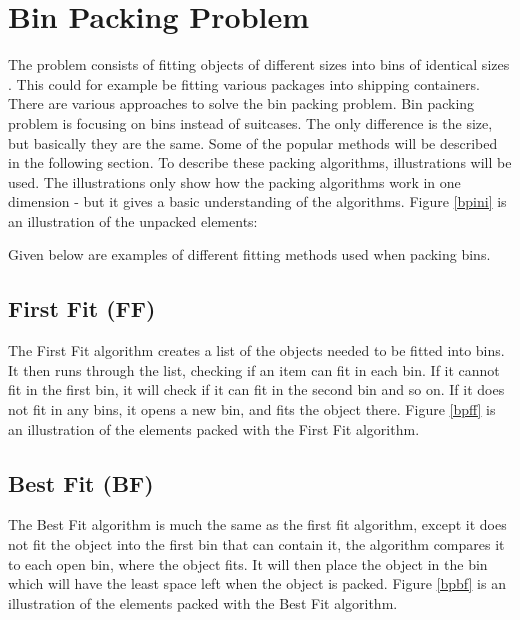 \section{Bin Packing Problem}
\label{sec:binpacking}


The problem consists of fitting objects of different sizes into bins of identical sizes \citep{appofdismath}. This could for example be fitting various packages into shipping containers. There are various approaches to solve the bin packing problem. Bin packing problem is focusing on bins instead of suitcases. The only difference is the size, but basically they are the same. Some of the popular methods will be described in the following section. To describe these packing algorithms, illustrations will be used. The illustrations only show how the packing algorithms work in one dimension - but it gives a basic understanding of the algorithms. Figure \ref{bpini} is an illustration of the unpacked elements:

Given below are examples of different fitting methods used when packing bins.

\subsection{First Fit (FF)}
The First Fit algorithm creates a list of the objects needed to be fitted into bins. It then runs through the list, checking if an item can fit in each bin. If it cannot fit in the first bin, it will check if it can fit in the second bin and so on. If it does not fit in any bins, it opens a new bin, and fits the object there. Figure \ref{bpff} is an illustration of the elements packed with the First Fit algorithm.

\subsection{Best Fit (BF)}
The Best Fit algorithm is much the same as the first fit algorithm, except it does not fit the object into the first bin that can contain it, the algorithm compares it to each open bin, where the object fits. It will then place the object in the bin which will have the least space left when the object is packed. Figure \ref{bpbf} is an illustration of the elements packed with the Best Fit algorithm.

